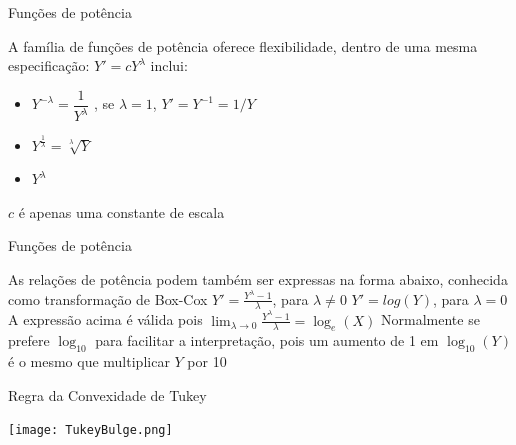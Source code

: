 \documentclass{beamer}\usepackage[]{graphicx}\usepackage[]{color}
\begin{document}
\begin{frame}{Funções de potência}

A família de funções de potência oferece flexibilidade, dentro de uma mesma especificação: \pause
\vfill
$Y' = cY^\lambda$ inclui: \pause
\vfill
\begin{itemize}
\item $Y^{-\lambda} = \dfrac{1}{Y^\lambda}$ \pause, se $\lambda = 1$, $Y' = Y^{-1} = 1/Y$ \pause
\vfill
\item $Y^{\frac{1}{\lambda}} = \sqrt[\lambda]{Y}$ \pause
\vfill
\item $Y^\lambda$ \pause
\end{itemize}
\vfill
$c$ é apenas uma constante de escala
  
\end{frame}


\begin{frame}{Funções de potência}

As relações de potência podem também ser expressas na forma abaixo, conhecida como transformação de Box-Cox \pause
\vfill
$ Y' = \frac{Y^\lambda - 1}{\lambda}$, para $\lambda \neq 0$  \pause
\vfill
$Y' = log(Y)$, para $\lambda = 0$ \pause
\vfill
A expressão acima é válida pois $\lim_{\lambda \to 0} \frac{Y^\lambda - 1}{\lambda} = \log _e (X)$ \pause
\vfill
Normalmente se prefere $\log _{10}$ para facilitar a interpretação, pois um aumento de 1 em $\log _{10}(Y)$ é o mesmo que multiplicar $Y$ por 10
  
\end{frame}

\begin{frame}{Regra da Convexidade de Tukey}


\centering

\texttt{[image: TukeyBulge.png]}


\end{frame}
\end{document}
